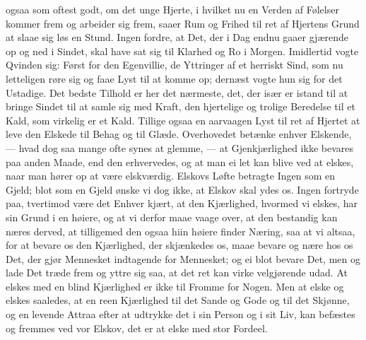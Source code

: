 \documentclass[12pt,a4paper]{book}
\newcommand{\apage}[1]{\marginnote{\footnotesize\textit{[#1]}}}
\begin{document}
ogsaa som oftest godt, om det unge Hjerte, i hvilket nu en Verden af
Følelser kommer frem og arbeider sig frem, saaer Rum og Frihed til ret
af Hjertens Grund at slaae sig løs en Stund. Ingen fordre, at Det, der i
Dag endnu gaaer gjærende op og ned i Sindet, skal have sat sig til
Klarhed og Ro i Morgen. Imidlertid vogte Qvinden sig: Først for den
Egenvillie, de Yttringer af et herriskt Sind, som nu letteligen røre sig
og faae Lyst til at komme op; dernæst vogte hun sig for det Ustadige.
Det bedste Tilhold er her det nærmeste, det, der især er istand til at
bringe Sindet til at samle sig med Kraft, den hjertelige og trolige
Beredelse til et Kald, som virkelig er et Kald. Tillige ogsaa en
aarvaagen Lyst til ret af Hjertet at leve den Elskede til Behag og til
Glæde. Overhovedet betænke enhver Elskende, --- hvad dog saa mange ofte
synes at glemme, --- at Gjenkjærlighed ikke bevares paa anden Maade, end
den erhvervedes, og at man ei let kan blive ved at elskes, naar man
hører op at være elskværdig. Elskovs Løfte betragte Ingen som en Gjeld;
blot som en Gjeld ønske vi dog ikke, at Elskov skal ydes os. \apage{111} Ingen
fortryde paa, tvertimod være det Enhver kjært, at den Kjærlighed,
hvormed vi elskes, har sin Grund i en høiere, og at vi derfor maae vaage
over, at den bestandig kan næres derved, at tilligemed den ogsaa hiin
høiere finder Næring, saa at vi altsaa, for at bevare os den Kjærlighed,
der skjænkedes os, maae bevare og nære hos os Det, der gjør Mennesket
indtagende for Mennesket; og ei blot bevare Det, men og lade Det træde
frem og yttre sig saa, at det ret kan virke velgjørende udad. At elskes
med en blind Kjærlighed er ikke til Fromme for Nogen. Men at elske og
elskes saaledes, at en reen Kjærlighed til det Sande og Gode og til det
Skjønne, og en levende Attraa efter at udtrykke det i sin Person og i
sit Liv, kan befæstes og fremmes ved vor Elskov, det er at elske med
stor Fordeel.
\end{document}
